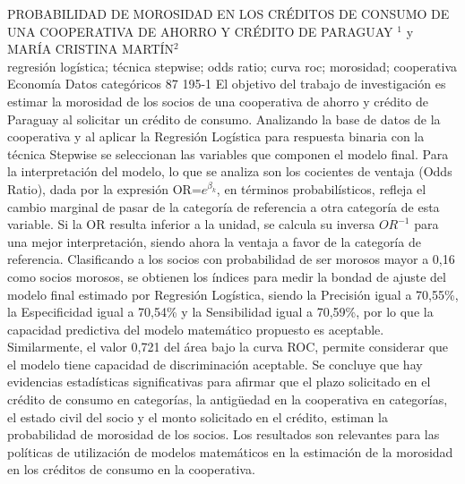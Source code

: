 \A
{PROBABILIDAD DE MOROSIDAD EN LOS CRÉDITOS DE CONSUMO DE UNA COOPERATIVA DE AHORRO Y CRÉDITO DE PARAGUAY}
{$^1$ y MARÍA CRISTINA MARTÍN$^2$}
{
\\}
{regresión logística; técnica stepwise; odds ratio; curva roc; morosidad; cooperativa} 
 {Economía} 
 {Datos categóricos} 
 {87} 
 {195-1}
{El objetivo del trabajo de investigación es estimar la morosidad de los socios de una cooperativa de ahorro y crédito de Paraguay al solicitar un crédito de consumo. Analizando la base de datos de la cooperativa y al aplicar la Regresión Logística para respuesta binaria con la técnica Stepwise se seleccionan las variables que componen el modelo final. Para la interpretación del modelo, lo que se analiza son los cocientes de ventaja (Odds Ratio), dada por la expresión OR=$e^{\beta_k}$, en términos probabilísticos, refleja el cambio marginal de pasar de la categoría de referencia a otra categoría de esta variable. Si la OR resulta inferior a la unidad, se calcula su inversa $OR^{-1}$ para una mejor interpretación, siendo ahora la ventaja a favor de la categoría de referencia. Clasificando a los socios con probabilidad de ser morosos mayor a 0,16 como socios morosos, se obtienen los índices para medir la bondad de ajuste del modelo final estimado por Regresión Logística, siendo la Precisión igual a 70,55\%, la Especificidad igual a 70,54\% y la Sensibilidad igual a 70,59\%, por lo que la capacidad predictiva del modelo matemático propuesto es aceptable. Similarmente, el valor 0,721 del área bajo la curva ROC, permite considerar que el modelo tiene capacidad de discriminación aceptable. Se concluye que hay evidencias estadísticas significativas para afirmar que el plazo solicitado en el crédito de consumo en categorías, la antigüedad en la cooperativa en categorías, el estado civil del socio y el monto solicitado en el crédito, estiman la probabilidad de morosidad de los socios. Los resultados son relevantes para las políticas de utilización de modelos matemáticos en la estimación de la morosidad en los créditos de consumo en la cooperativa.}
